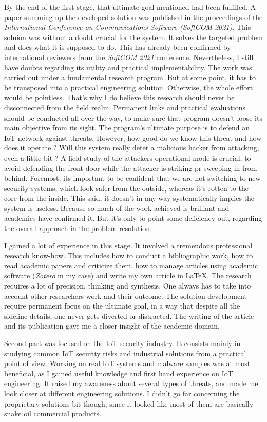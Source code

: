 By the end of the first stage, that ultimate goal mentioned had been fulfilled. A paper summing up the developed solution was published in the proceedings of the \emph{International Conference on Communications Software (SoftCOM 2021)}. This soluion was without a doubt crucial for the system. It solves the targeted problem and does what it is supposed to do. This has already been confirmed by international reviewers from the \emph{SoftCOM 2021} conference. Nevertheless, I still have doubts regarding its utility and practical implementability. The work was carried out under a fundamental research program. But at some point, it has to be transposed into a practical engineering solution. Otherwise, the whole effort would be pointless. That's why I do believe this research should never be disconnected from the field realm. Permanent links and practical evaluations should be conducted all over the way, to make sure that program doesn't loose its main objective from its sight. The program's ultimate purpose is to defend an IoT network against threats. However, how good do we know this threat and how does it operate ? Will this system really deter a malicious hacker from attacking, even a little bit ? A field study of the attackers operational mode is crucial, to avoid defending the front door while the attacker is striking pr sweeping in from behind. Foremost, its important to be confident that we are not switching to new security systems, which look safer from the outside, whereas it's rotten to the core from the inside. This said, it doesn't in any way systematically implies the system is useless. Because so much of the work achieved is brilliant and academics have confirmed it. But it's only to point some deficiency out, regarding the overall approach in the problem resolution.

I gained a lot of experience in this stage. It involved a tremendous professional research know-how. This includes how to conduct a bibliographic work, how to read academic papers and criticize them, how to manage articles using academic software (\emph{Zotero} in my case) and write my own article in \LaTeX. The research requires a lot of precision, thinking and synthesis. One always has to take into account other researchers work and their outcome. The solution development require permanent focus on the ultimate goal, in a way that despite all the sideline details, one never gets diverted or distracted. The writing of the article and its publication gave me a closer insight of the academic domain.

Second part was focused on the IoT security industry. It consists mainly in studying common IoT security risks and industrial solutions from a practical point of view. Working on real IoT systems and malware samples was at most beneficial, as I gained useful knowledge and first hand experience on IoT engineering. It raised my awareness about several types of threats, and made me look closer at different engineering solutions. I didn't go far concerning the proprietary solutions bit though, since it looked like most of them are basically snake oil commercial products.

